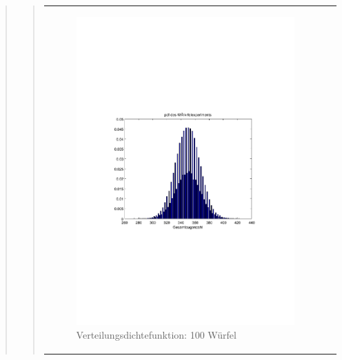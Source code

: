 \begin{quote}
\begin{quote}
\begin{center}
\begin{tabular}{ll}
            \begin{minipage}{0.6\textwidth}
                \begin{figure}[H]
                    \label{fig:pico_funktion0alpha}
                    \includegraphics[scale=0.7, trim = 20mm 80mm 20mm 90mm, clip]{Bilder/A1_3_100}
                    \caption{Verteilungsdichtefunktion: 100 Würfel}
                \end{figure}
        
            \end{minipage}
        
        \end{tabular}
        \end{center}



\end{quote}
\end{quote}
